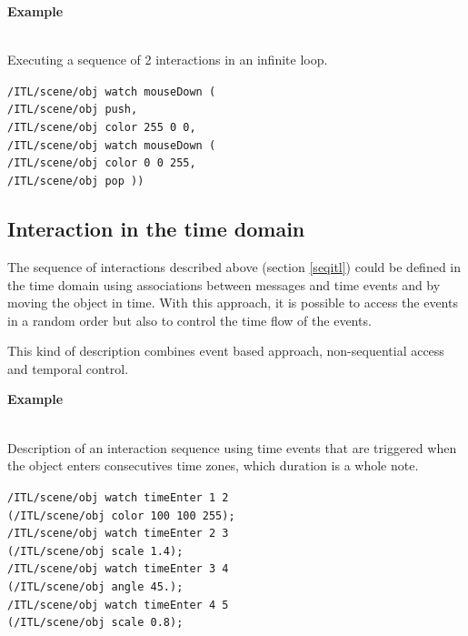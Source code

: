\documentclass{article}
\newcounter{excount}
\newcommand{\exemple}			{\vspace{1mm} \hspace*{-4.5mm}\textbf{Example \arabic{excount}} \addtocounter{excount}{1}}
\newcommand{\sample}	[1]		{\begin{center}\colorbox{mygrey}{
								\begin{minipage}[t]{0.95\columnwidth} 
								{\small \texttt{#1}}
								\end{minipage}}\end{center}}
\begin{document}
\exemple \\
Executing a sequence of 2 interactions in an infinite loop.
\sample{/ITL/scene/obj watch mouseDown ( 		\\
\hspace*{4mm}/ITL/scene/obj push,	\\
\hspace*{4mm}/ITL/scene/obj color 255 0 0,	\\
\hspace*{4mm}/ITL/scene/obj watch mouseDown (		\\
\hspace*{8mm}/ITL/scene/obj color 0 0 255,	\\
\hspace*{8mm}/ITL/scene/obj pop ))	\\
} 


\subsection{Interaction in the time domain}

The sequence of interactions described above (section \ref{seqitl}) could be defined in the time domain using associations between messages and time events and by moving the object in time. With this approach, it is possible to access the events in a random order but also to control the time flow of the events.

This kind of description combines event based approach, non-sequential access and temporal control.

\exemple   \\
Description of an interaction sequence using time events that are triggered when the object enters consecutives time zones, which duration is a whole note.
\sample{/ITL/scene/obj watch timeEnter 1 2	\\
\hspace*{10mm}(/ITL/scene/obj color 100 100 255);	\\
/ITL/scene/obj watch timeEnter 2 3	\\
\hspace*{10mm}(/ITL/scene/obj scale 1.4);	\\
/ITL/scene/obj watch timeEnter 3 4	\\
\hspace*{10mm}(/ITL/scene/obj angle 45.);	\\
/ITL/scene/obj watch timeEnter 4 5	\\
\hspace*{10mm}(/ITL/scene/obj scale 0.8);
}
\end{document}
